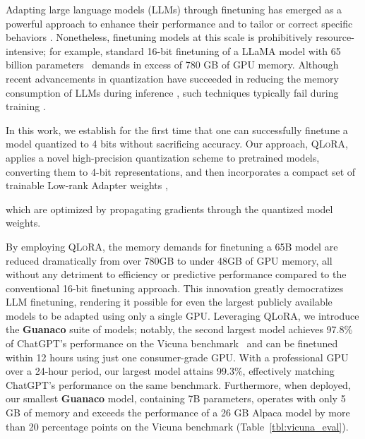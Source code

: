 Adapting large language models (LLMs) through finetuning has emerged as a powerful approach to enhance their performance \citep{min2021metaicl, wei2021finetuned, ouyang2022training, wang2022super, wang2022self, liu2022few} and to tailor or correct specific behaviors \citep{ouyang2022training,askell2021general,bai2022training}. Nonetheless, finetuning models at this scale is prohibitively resource-intensive; for example, standard 16-bit finetuning of a LLaMA model with 65 billion parameters~\citep{touvron2023llama} demands in excess of 780 GB of GPU memory. Although recent advancements in quantization have succeeded in reducing the memory consumption of LLMs during inference \citep{dettmers2022llm, dettmers2022case, frantar2022gptq, xiao2022smoothquant}, such techniques typically fail during training \citep{wortsman2023stable}.

In this work, we establish for the first time that one can successfully finetune a model quantized to 4 bits without sacrificing accuracy. Our approach, \textsc{QLoRA}, applies a novel high-precision quantization scheme to pretrained models, converting them to 4-bit representations, and then incorporates a compact set of trainable Low-rank Adapter weights \citep{hu2021lora}, 

which are optimized by propagating gradients through the quantized model weights. 

By employing \textsc{QLoRA}, the memory demands for finetuning a 65B model are reduced dramatically from over 780GB to under 48GB of GPU memory, all without any detriment to efficiency or predictive performance compared to the conventional 16-bit finetuning approach. This innovation greatly democratizes LLM finetuning, rendering it possible for even the largest publicly available models to be adapted using only a single GPU. Leveraging \textsc{QLoRA}, we introduce the \textbf{Guanaco} suite of models; notably, the second largest model achieves 97.8\% of ChatGPT's performance on the Vicuna benchmark~\citep{vicuna2023} and can be finetuned within 12 hours using just one consumer-grade GPU. With a professional GPU over a 24-hour period, our largest model attains 99.3\%, effectively matching ChatGPT's performance on the same benchmark. Furthermore, when deployed, our smallest \textbf{Guanaco} model, containing 7B parameters, operates with only 5 GB of memory and exceeds the performance of a 26 GB Alpaca model by more than 20 percentage points on the Vicuna benchmark (Table~\ref{tbl:vicuna_eval}).


